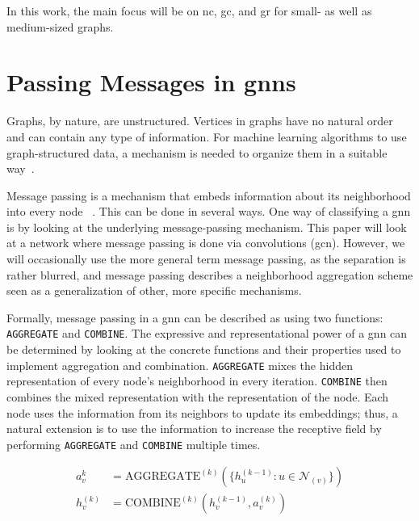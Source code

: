 In this work, the main focus will be on \ac{nc}, \ac{gc}, and \ac{gr} for small- as well as medium-sized graphs.

\section{Passing Messages in \Acsp*{gnn}}
\label{sec:related:message}

Graphs, by nature, are unstructured.
Vertices in graphs have no natural order and can contain any type of information.
For machine learning algorithms to use graph-structured data, a mechanism is needed to organize them in a
suitable way~\cite{Zhou2020a,Hamilton2017a,Zhang19}.


Message passing is a mechanism that embeds information about its neighborhood into every node ~\cite{Xu2019,Zhou2020a}.
This can be done in several ways.
One way of classifying a \ac{gnn} is by looking at the underlying message-passing mechanism.
This paper will look at a network where message passing is done via convolutions (\acf{gcn}).
However, we will occasionally use the more general term message passing, as the separation is rather blurred, and message passing describes a neighborhood aggregation scheme seen as a generalization of other, more specific mechanisms.

Formally, message passing in a \ac{gnn} can be described as using two functions:
\texttt{AGGREGATE} and \texttt{COMBINE}.
The expressive and representational power of a \ac{gnn} can be determined by looking at the concrete functions and their properties used to implement aggregation and combination.
\texttt{AGGREGATE} mixes the hidden representation of every node's neighborhood in every iteration.
\texttt{COMBINE} then combines the mixed representation with the representation of the node.
Each node uses the information from its neighbors to update its embeddings;
thus, a natural extension is to use the information to increase the receptive field by performing \texttt{AGGREGATE} and \texttt{COMBINE} multiple times.

\begin{align*}
    a_{v}^{k}   & = \mathrm{AGGREGATE}^{(k)}(\{h_{u}^{(k-1)}: u \in \mathcal{N}_{(v)}\}) \\
    h_{v}^{(k)} & = \mathrm{COMBINE}^{(k)}(h_{v}^{(k-1)}, a_{v}^{(k)})
\end{align*}

